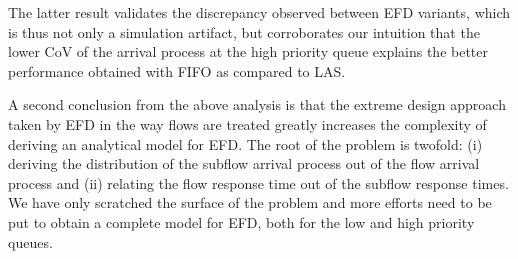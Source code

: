 \documentclass[preprint,12pt]{elsarticle}
\begin{document}
The latter result validates the discrepancy observed between EFD variants, which is thus not only a simulation artifact, but corroborates our intuition that the lower CoV of the arrival process at the high priority queue explains the better performance obtained with FIFO as compared to LAS.

A second conclusion from the above analysis is that the extreme design approach taken by EFD in the way flows are treated greatly increases the complexity of deriving an analytical model for EFD. The root of the problem is twofold: (i) deriving the distribution of the subflow arrival process out of the flow arrival process and (ii) relating the flow response time out of the subflow response times. We have only scratched the surface of the problem and more efforts need to be put to obtain a complete model for EFD, both for the low and high priority queues.

\end{document}
